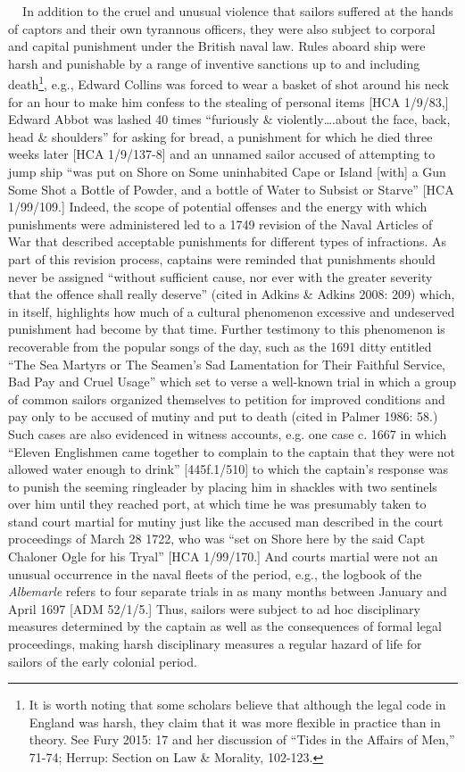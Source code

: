 \documentclass[12pt]{article}
\newenvironment{styleStandard}{\renewcommand\baselinestretch{1.0}\setlength\leftskip{0cm}\setlength\rightskip{0cm plus 1fil}\setlength\parindent{0cm}\setlength\parfillskip{0pt plus 1fil}\setlength\parskip{0in plus 1pt}\writerlistparindent\writerlistleftskip\leavevmode\normalfont\normalsize\writerlistlabel\ignorespaces}{\unskip\vspace{0in plus 1pt}\par}
\newcommand\writerlistleftskip{}
\newcommand\writerlistparindent{}
\newcommand\writerlistlabel{}
\begin{document}
\begin{styleStandard}
\textbf{\ \ }In addition to the cruel and unusual violence that sailors suffered at the hands of captors and their own tyrannous officers, they were also subject to corporal and capital punishment under the British naval law. Rules aboard ship were harsh and punishable by a range of inventive sanctions up to and including death\footnote{ It is worth noting that some scholars believe that although the legal code in England was harsh, they claim that it was more flexible in practice than in theory. See Fury 2015: 17 and her discussion of “Tides in the Affairs of Men,” 71-74; Herrup: Section on Law \& Morality, 102-123.}, e.g., Edward Collins was forced to wear a basket of shot around his neck for an hour to make him confess to the stealing of personal items [HCA 1/9/83,] Edward Abbot was lashed 40 times “furiously \& violently….about the face, back, head \& shoulders” for asking for bread, a punishment for which he died three weeks later [HCA 1/9/137-8] and an unnamed sailor accused of attempting to jump ship “was put on Shore on Some uninhabited Cape or Island [with] a Gun Some Shot a Bottle of Powder, and a bottle of Water to Subsist or Starve” [HCA 1/99/109.] Indeed, the scope of potential offenses and the energy with which punishments were administered led to a 1749 revision of the Naval Articles of War that described acceptable punishments for different types of infractions. As part of this revision process, captains were reminded that punishments should never be assigned “without sufficient cause, nor ever with the greater severity that the offence shall really deserve” (cited in Adkins \& Adkins 2008: 209) which, in itself, highlights how much of a cultural phenomenon excessive and undeserved punishment had become by that time. Further testimony to this phenomenon is recoverable from the popular songs of the day, such as the 1691 ditty entitled “The Sea Martyrs or The Seamen’s Sad Lamentation for Their Faithful Service, Bad Pay and Cruel Usage” which set to verse a well-known trial in which a group of common sailors organized themselves to petition for improved conditions and pay only to be accused of mutiny and put to death (cited in Palmer 1986: 58.) Such cases are also evidenced in witness accounts, e.g. one case c. 1667 in which “Eleven Englishmen\textit{ }came together to complain to the captain that they were not allowed water enough to drink” [445f.1/510] to which the captain’s response was to punish the seeming ringleader by placing him in shackles with two sentinels over him until they reached port, at which time he was presumably taken to stand court martial for mutiny just like the accused man described in the court proceedings of March 28 1722, who was “set on Shore here by the said Capt Chaloner Ogle for his Tryal” [HCA 1/99/170.] And courts martial were not an unusual occurrence in the naval fleets of the period, e.g., the logbook of the \textit{Albemarle} refers to four separate trials in as many months between January and April 1697 [ADM 52/1/5.] Thus, sailors were subject to ad hoc disciplinary measures determined by the captain as well as the consequences of formal legal proceedings, making harsh disciplinary measures a regular hazard of life for sailors of the early colonial period.

\end{styleStandard}
\end{document}
